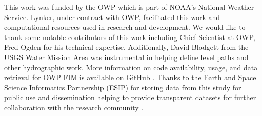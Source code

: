 \documentclass[draft]{dependencies/agujournal2019}
\begin{document}
\acknowledgments
This work was funded by the OWP which is part of NOAA's National Weather Service.
Lynker, under contract with OWP, facilitated this work and computational resources used in research and development.
We would like to thank some notable contributors of this work including Chief Scientist at OWP, Fred Ogden for his technical expertise.
Additionally, David Blodgett from the USGS Water Mission Area was instrumental in helping define level paths and other hydrographic work.
More information on code availability, usage, and data retrieval for OWP FIM is available on GitHub \cite{inundationMapping2022}.
Thanks to the Earth and Space Science Informatics Partnership (ESIP) for storing data from this study for public use and dissemination helping to provide transparent datasets for further collaboration with the research community \cite{esipData2022}.



%
%
%
\clearpage %

%
%
%
%
%
%
\end{document}
